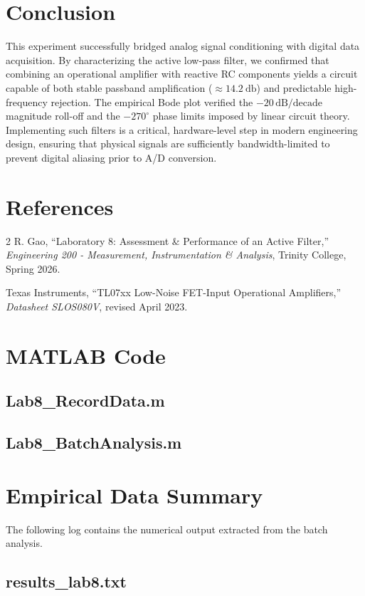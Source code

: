 \documentclass[11pt]{article}
\begin{document}
\section{Conclusion}
This experiment successfully bridged analog signal conditioning with digital data acquisition. By characterizing the active low-pass filter, we confirmed that combining an operational amplifier with reactive RC components yields a circuit capable of both stable passband amplification ($\approx \SI{14.2}{\decibel}$) and predictable high-frequency rejection. The empirical Bode plot verified the $-20\,\text{dB/decade}$ magnitude roll-off and the $-270^\circ$ phase limits imposed by linear circuit theory. Implementing such filters is a critical, hardware-level step in modern engineering design, ensuring that physical signals are sufficiently bandwidth-limited to prevent digital aliasing prior to A/D conversion.

\section{References}
\begin{thebibliography}{2}
  R. Gao, ``Laboratory 8: Assessment \& Performance of an Active Filter,'' \textit{Engineering 200 - Measurement, Instrumentation \& Analysis}, Trinity College, Spring 2026.

  Texas Instruments, ``TL07xx Low-Noise FET-Input Operational Amplifiers,'' \textit{Datasheet SLOS080V}, revised April 2023.
\end{thebibliography}

\newpage
\appendix
\section{MATLAB Code}

\subsection{Lab8\_RecordData.m}


\subsection{Lab8\_BatchAnalysis.m}


\newpage
\section{Empirical Data Summary}
The following log contains the numerical output extracted from the batch analysis.

\subsection{results\_lab8.txt}

\end{document}
